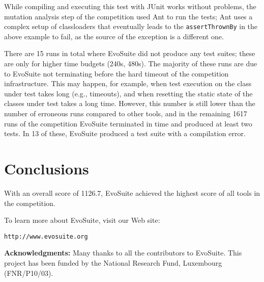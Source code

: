 \documentclass[10pt,conference]{IEEEtran}
\newcommand{\EVOSUITE}{{\sc EvoSuite}\xspace}
\begin{document}
While compiling and executing this test with JUnit works without
problems, the mutation analysis step of the competition used Ant to
run the tests; Ant uses a complex setup of classloaders that
eventually leads to the \texttt{assertThrownBy} in the above example
to fail, as the source of the exception is a different one.

There are 15 runs in total where \EVOSUITE did not produce any test
suites; these are only for higher time budgets (240s, 480s). The
majority of these runs are due to \EVOSUITE not terminating before the
hard timeout of the competition infrastructure. This may happen, for
example, when test execution on the class under test takes long (e.g.,
timeouts), and when resetting the static state of the classes under
test takes a long time. However, this number is still lower than the
number of erroneous runs compared to other tools, and in the remaining
1617 runs of the competition \EVOSUITE terminated in time and produced
at least two tests. In 13 of these, \EVOSUITE produced a test suite
with a compilation error.

\section{Conclusions}

With an overall score of 1126.7, \EVOSUITE achieved the highest score
of all tools in the competition. 


To learn more about \EVOSUITE, visit our Web site:
\begin{center}
\texttt{http://www.evosuite.org}
\end{center}



\textbf{Acknowledgments:} Many thanks to all the contributors to \EVOSUITE.
This project has been funded by 
the National Research Fund, Luxembourg (FNR/P10/03).





\balance
\end{document}
